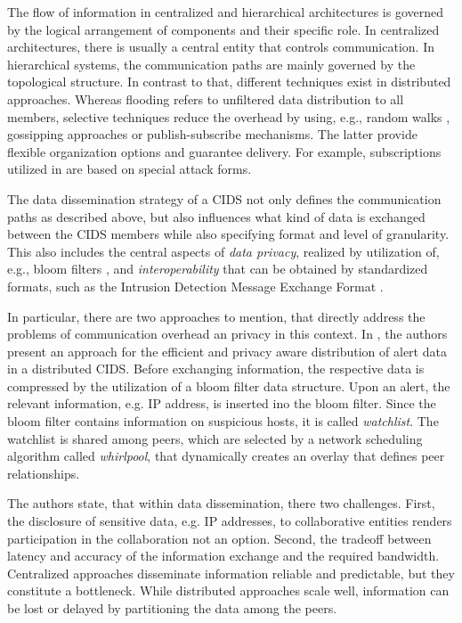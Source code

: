 The flow of information in centralized and hierarchical architectures is governed by the logical arrangement of components and their specific role. In centralized architectures, there is usually a central entity that controls communication. In hierarchical systems, the communication paths are mainly governed by the topological structure. In contrast to that, different techniques exist in distributed approaches. Whereas flooding refers to unfiltered data distribution to all members, selective techniques reduce the overhead by using, e.g., random walks \cite{Vishnumurthy2006}, gossipping approaches \cite{Dash2006}\cite{Ganesh2003} or publish-subscribe mechanisms. The latter provide flexible organization options and guarantee delivery. For example, subscriptions utilized in \cite{Janakiraman2003} are based on special attack forms.

The data dissemination strategy of a CIDS not only defines the communication paths as described above, but also influences what kind of data is exchanged between the CIDS members while also specifying format and level of granularity. This also includes the central aspects of \textit{data privacy}, realized by utilization of, e.g., bloom filters \cite{Vasilomanolakis2015SkipMon}\cite{Locasto2005}, and \textit{interoperability} that can be obtained by standardized formats, such as the Intrusion Detection Message Exchange Format \cite{Cuppens2002}\cite{Duma2006}.

In particular, there are two approaches to mention, that directly address the problems of communication overhead an privacy in this context. In \cite{Locasto2005}, the authors present an approach for the efficient and privacy aware distribution of alert data in a distributed CIDS. Before exchanging information, the respective data is compressed by the utilization of a bloom filter data structure. Upon an alert, the relevant information, e.g. IP address, is inserted ino the bloom filter. Since the bloom filter contains information on suspicious hosts, it is called \textit{watchlist}. The watchlist is shared among peers, which are selected by a network scheduling algorithm called \textit{whirlpool}, that dynamically creates an overlay that defines peer relationships.

The authors state, that within data dissemination, there two challenges. First, the disclosure of sensitive data, e.g. IP addresses, to collaborative entities renders participation in the collaboration not an option. Second, the tradeoff between latency and accuracy of the information exchange and the required bandwidth. Centralized approaches disseminate information reliable and predictable, but they constitute a bottleneck. While distributed approaches scale well, information can be lost or delayed by partitioning the data among the peers.

